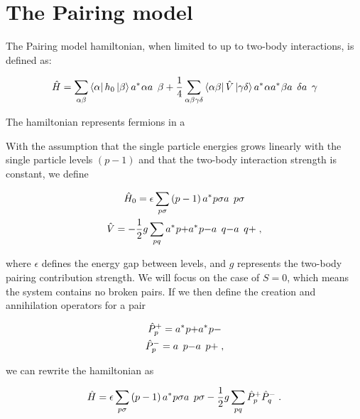 \section{The Pairing model}

The Pairing model hamiltonian, when limited to up to two-body interactions, is defined as:

\begin{equation}
  \hat{H} = \sum_{\alpha\beta} \bra{\alpha}h_0\ket{\beta}\hc{a}{\alpha}\op{a}{\beta} + \frac{1}{4} \sum_{\alpha\beta\gamma\delta} \bra{\alpha\beta}\hat{V}\ket{\gamma\delta} \hc{a}{\alpha}\hc{a}{\beta}\op{a}{\delta}\op{a}{\gamma}
  \label{eq:Pairing_model_theory}
\end{equation}

The hamiltonian represents fermions in a 

With the assumption that the single particle energies grows linearly with the single particle levels $(p - 1)$ and that the two-body interaction strength is constant, we define

\begin{equation}
  \begin{gathered}
    \hat{H}_0 = \epsilon \sum_{p\sigma} \left(p - 1\right) \hc{a}{p\sigma} \op{a}{p\sigma} \\
    \hat{V} = -\frac{1}{2}g\sum_{pq} \hc{a}{p+}\hc{a}{p-}\op{a}{q-}\op{a}{q+} \; ,
  \end{gathered}
  \label{eq:sub_hamiltonian_pairing_imp}
\end{equation}

where $\epsilon$ defines the energy gap between levels, and $g$ represents the two-body pairing contribution strength. We will focus on the case of $S=0$, which means the system contains no broken pairs. If we then define the creation and annihilation operators for a pair

\begin{equation*}
  \begin{gathered}
    \hat{P}_p^+ = \hc{a}{p+}\hc{a}{p-}\\
    \hat{P}_p^- = \op{a}{p-}\op{a}{p+} \; ,
  \end{gathered}
\end{equation*}

  we can rewrite the hamiltonian as

\begin{equation}
  \hat{H} = \epsilon \sum_{p\sigma} \left(p-1\right)\hc{a}{p\sigma}\op{a}{p\sigma} - \frac{1}{2}g\sum_{pq}\hat{P}_p^+\hat{P}_q^- \; .
  \label{eq:Pairing_model_final}
\end{equation}

